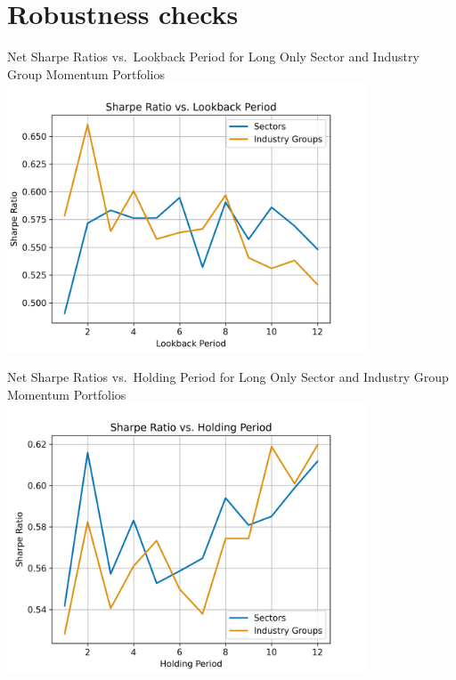 \documentclass{beamer}
\begin{document}
\section{Robustness checks}
\begin{frame}{Net Sharpe Ratios vs.~Lookback Period for Long Only Sector and Industry Group Momentum Portfolios}
    \centering %
    \includegraphics[width=0.8\textwidth]{Figures/robustness_check_lb.png}    

\end{frame}


\begin{frame}{Net Sharpe Ratios vs.~Holding Period for Long Only Sector and Industry Group Momentum Portfolios}
    \centering %
    \includegraphics[width=0.8\textwidth]{Figures/robustness_check_ih.png}    

\end{frame}
\end{document}
